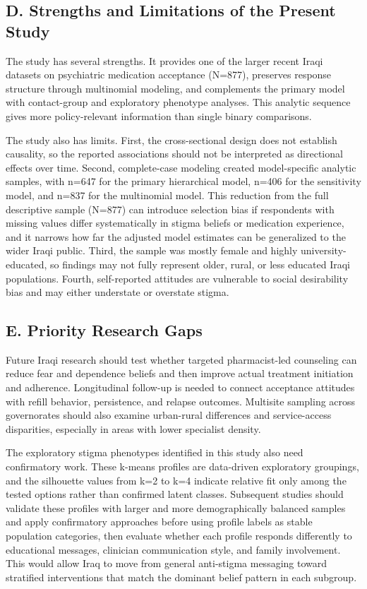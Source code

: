 \subsection{D. Strengths and Limitations of the Present
Study}\label{d.-strengths-and-limitations-of-the-present-study}

The study has several strengths. It provides one of the larger recent
Iraqi datasets on psychiatric medication acceptance (N=877), preserves
response structure through multinomial modeling, and complements the
primary model with contact-group and exploratory phenotype analyses.
This analytic sequence gives more policy-relevant information than
single binary comparisons.

The study also has limits. First, the cross-sectional design does not
establish causality, so the reported associations should not be
interpreted as directional effects over time. Second, complete-case
modeling created model-specific analytic samples, with n=647 for the
primary hierarchical model, n=406 for the sensitivity model, and n=837
for the multinomial model. This reduction from the full descriptive
sample (N=877) can introduce selection bias if respondents with missing
values differ systematically in stigma beliefs or medication experience,
and it narrows how far the adjusted model estimates can be generalized
to the wider Iraqi public. Third, the sample was mostly female and
highly university-educated, so findings may not fully represent older,
rural, or less educated Iraqi populations. Fourth, self-reported
attitudes are vulnerable to social desirability bias and may either
understate or overstate stigma.

\subsection{E. Priority Research Gaps}\label{e.-priority-research-gaps}

Future Iraqi research should test whether targeted pharmacist-led
counseling can reduce fear and dependence beliefs and then improve
actual treatment initiation and adherence. Longitudinal follow-up is
needed to connect acceptance attitudes with refill behavior,
persistence, and relapse outcomes. Multisite sampling across
governorates should also examine urban-rural differences and
service-access disparities, especially in areas with lower specialist
density.

The exploratory stigma phenotypes identified in this study also need
confirmatory work. These k-means profiles are data-driven exploratory
groupings, and the silhouette values from k=2 to k=4 indicate relative
fit only among the tested options rather than confirmed latent classes.
Subsequent studies should validate these profiles with larger and more
demographically balanced samples and apply confirmatory approaches
before using profile labels as stable population categories, then
evaluate whether each profile responds differently to educational
messages, clinician communication style, and family involvement. This
would allow Iraq to move from general anti-stigma messaging toward
stratified interventions that match the dominant belief pattern in each
subgroup.

